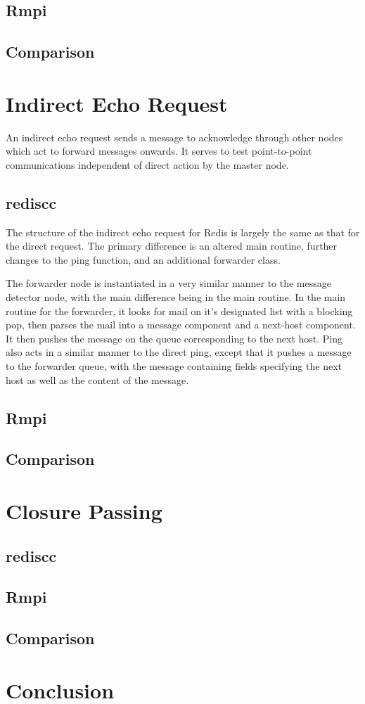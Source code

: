 \documentclass[10pt,a4paper]{article}
\begin{document}
\subsection{Rmpi}
\subsection{Comparison}
\section{Indirect Echo Request}
An indirect echo request sends a message to acknowledge through other nodes which act to forward messages onwards.
It serves to test point-to-point communications independent of direct action by the master node.

\subsection{rediscc}
The structure of the indirect echo request for Redis is largely the same as that for the direct request.
The primary difference is an altered main routine, further changes to the ping function, and an additional forwarder class.

The forwarder node is instantiated in a very similar manner to the message detector node, with the main difference being in the main routine.
In the main routine for the forwarder, it looks for mail on it's designated list with a blocking pop, then parses the mail into a message component and a next-host component. 
It then pushes the message on the queue corresponding to the next host.
Ping also acts in a similar manner to the direct ping, except that it pushes a message to the forwarder queue, with the message containing fields specifying the next host as well as the content of the message.

\subsection{Rmpi}
\subsection{Comparison}
\section{Closure Passing}
\subsection{rediscc}
\subsection{Rmpi}
\subsection{Comparison}
\section{Conclusion}



\printbibliography{}
\end{document}
